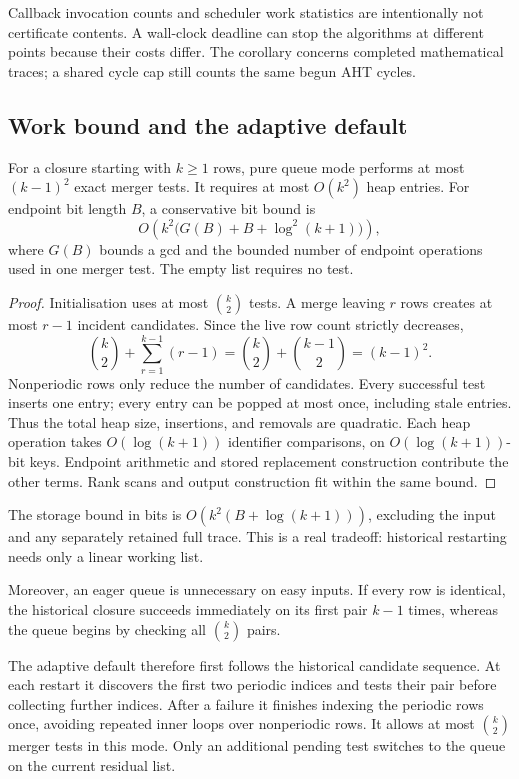 Callback invocation counts and scheduler work statistics are intentionally
not certificate contents. A wall-clock deadline can stop the algorithms at
different points because their costs differ. The corollary concerns
completed mathematical traces; a shared cycle cap still counts the same
begun AHT cycles.

\subsection{Work bound and the adaptive default}

\begin{theorem}
\label{thm:queue-work}
For a closure starting with \(k\ge1\) rows, pure queue mode performs at most
\((k-1)^2\) exact merger tests. It requires at most \(O(k^2)\) heap entries.
For endpoint bit length \(B\), a conservative bit bound is
\[
 O\!\left(k^2\bigl(G(B)+B+\log^2(k+1)\bigr)\right),
\]
where \(G(B)\) bounds a gcd and the bounded number of endpoint operations
used in one merger test. The empty list requires no test.
\end{theorem}
\begin{proof}
Initialisation uses at most \(\binom{k}{2}\) tests. A merge leaving \(r\)
rows creates at most \(r-1\) incident candidates. Since the live row count
strictly decreases,
\[
 \binom{k}{2}+\sum_{r=1}^{k-1}(r-1)
 =\binom{k}{2}+\binom{k-1}{2}
 =(k-1)^2.
\]
Nonperiodic rows only reduce the number of candidates. Every successful
test inserts one entry; every entry can be popped at most once, including
stale entries. Thus the total heap size, insertions, and removals are
quadratic. Each heap operation takes \(O(\log(k+1))\) identifier
comparisons, on \(O(\log(k+1))\)-bit keys. Endpoint arithmetic and stored
replacement construction contribute the other terms. Rank scans and
output construction fit within the same bound.
\end{proof}

The storage bound in bits is \(O(k^2(B+\log(k+1)))\), excluding the input
and any separately retained full trace. This is a real tradeoff:
historical restarting needs only a linear working list.

Moreover, an eager queue is unnecessary on easy inputs. If every row is
identical, the historical closure succeeds immediately on its first pair
\(k-1\) times, whereas the queue begins by checking all
\(\binom{k}{2}\) pairs.

The adaptive default therefore first follows the historical candidate
sequence. At each restart it discovers the first two periodic indices and
tests their pair before collecting further indices. After a failure it
finishes indexing the periodic rows once, avoiding repeated inner loops
over nonperiodic rows. It allows at most
\(\binom{k}{2}\) merger tests in this mode. Only an additional pending test
switches to the queue on the current residual list.

